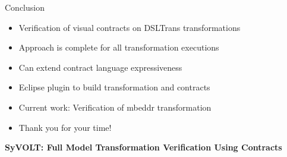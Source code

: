 \documentclass[xcolor=dvipsnames, 12pt, handout]{beamer}
\begin{document}
\begin{frame}{Conclusion}
\begin{itemize}[<+->]
\item Verification of visual contracts on DSLTrans transformations
\item Approach is complete for all transformation executions
\item Can extend contract language expressiveness
\item Eclipse plugin to build transformation and contracts
\item Current work: Verification of mbeddr transformation
\end{itemize}
\pause
\begin{itemize}
\item Thank you for your time!
\end{itemize}
\begin{center}
\textbf{SyVOLT: Full Model Transformation Verification Using Contracts}\\
\end{center}
\end{frame}
\end{document}
